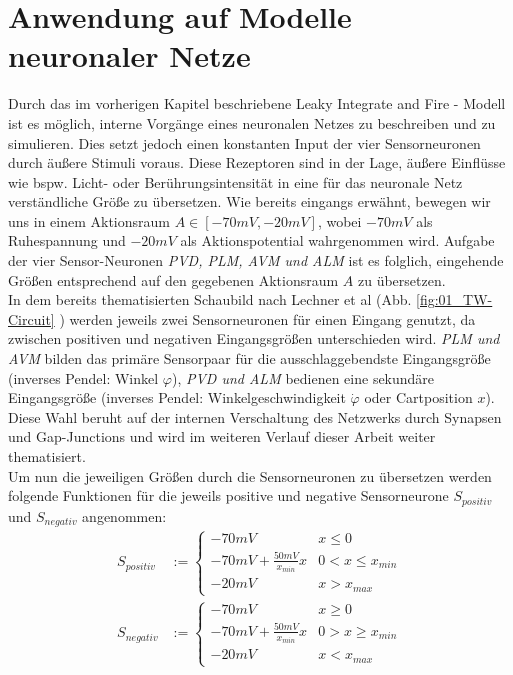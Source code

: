 \section{Anwendung auf Modelle neuronaler Netze}
\label{sec:lif_neuro}
	Durch das im vorherigen Kapitel beschriebene Leaky Integrate and Fire - Modell ist es möglich, interne Vorgänge eines neuronalen Netzes zu beschreiben und zu simulieren. Dies setzt jedoch einen konstanten Input der vier Sensorneuronen durch äußere Stimuli voraus. Diese Rezeptoren sind in der Lage, äußere Einflüsse wie bspw. Licht- oder Berührungsintensität in eine für das neuronale Netz verständliche Größe zu übersetzen. Wie bereits eingangs erwähnt, bewegen wir uns in einem Aktionsraum $A\in[-70mV, -20mV]$, wobei $-70mV$ als Ruhespannung und $-20mV$ als Aktionspotential wahrgenommen wird. Aufgabe der vier Sensor-Neuronen \textit{PVD, PLM, AVM und ALM} ist es folglich, eingehende Größen entsprechend auf den gegebenen Aktionsraum $A$ zu übersetzen.\\
	In dem bereits thematisierten Schaubild nach Lechner et al (Abb. \ref{fig:01_TW-Circuit} \cite{WormLevelRL}) werden jeweils zwei Sensorneuronen für einen Eingang genutzt, da zwischen positiven und negativen Eingangsgrößen unterschieden wird. \textit{PLM und AVM} bilden das primäre Sensorpaar für die ausschlaggebendste Eingangsgröße (inverses Pendel: Winkel $\varphi$), \textit{PVD und ALM} bedienen eine sekundäre Eingangsgröße (inverses Pendel: Winkelgeschwindigkeit $\dot{\varphi}$ oder Cartposition $x$). Diese Wahl beruht auf der internen Verschaltung des Netzwerks durch Synapsen und Gap-Junctions und wird im weiteren Verlauf dieser Arbeit weiter thematisiert.\\
	Um nun die jeweiligen Größen durch die Sensorneuronen zu übersetzen werden folgende Funktionen für die jeweils positive und negative Sensorneurone $S_{positiv}$ und $S_{negativ}$ angenommen:
	\begin{align}
		\label{eq:sensor_translation_p}
		S_{positiv} &:= \begin{cases}-70mV & x\leq 0\\-70mV + \frac{50mV}{x_{min}}x & 0 < x \leq x_{min} \\-20mV & x > x_{max}  \end{cases}\\
		\label{eq:sensor_translation_n}
		S_{negativ} &:= \begin{cases}-70mV & x\geq 0\\-70mV + \frac{50mV}{x_{min}}x & 0 > x \geq x_{min} \\-20mV & x < x_{max}  \end{cases}
	\end{align}
